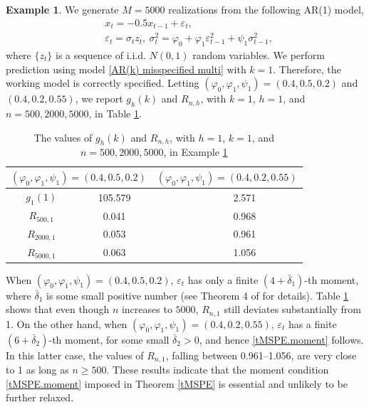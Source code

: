 \documentclass[ejsv2]{imsart}
\theoremstyle{plain}
\theoremstyle{definition}
\newtheorem{example}{Example}[section]
\theoremstyle{remark}
\begin{document}
\begin{example}\label{ex.S2.1}
We generate $M=5000$ realizations from the following
AR(1) model,
\begin{equation*}
\begin{split}
     & x_t=-0.5x_{t-1}+\varepsilon_t, \\
     & \varepsilon_t=\sigma_tz_t,\ \sigma_t^2=\varphi_0+\varphi_1\varepsilon_{t-1}^2+\psi_1\sigma_{t-1}^2,
\end{split}
\end{equation*}
where $\{z_t\}$ is a sequence of
i.i.d. $N(0,1)$ random variables.
We perform prediction using
model \eqref{AR(k) misspecified multi} with $k=1$. Therefore, the working model is correctly specified.
Letting $(\varphi_0,\varphi_1,\psi_1)=(0.4,0.5,0.2)$ and $(0.4,0.2,0.55)$,
we report $g_{h}(k)$ and $R_{n,h}$, with $k=1$, $h=1$,
and $n=500, 2000, 5000$, in Table \ref{tabS1}.
\end{example}

\begin{table}
\caption{The values of $g_{h}(k)$ and $R_{n,h}$, with $h=1$, $k=1$, and $n=500, 2000, 5000$, in Example \ref{ex.S2.1}}
\label{tabS1}
\centering
\begin{tabular}{cccc} \hline
    \multicolumn{2}{c}{$(\varphi_0,\varphi_1,\psi_1)=(0.4,0.5,0.2)$} &  \multicolumn{2}{c}{$(\varphi_0,\varphi_1,\psi_1)=(0.4,0.2,0.55)$}\\ \hline
   $g_{1}(1)$ & 105.579 &  & 2.571\\ \hline
   $R_{500,1}$ & 0.041 & & 0.968 \\
   $R_{2000,1}$ & 0.053 &  & 0.961 \\
   $R_{5000,1}$ & 0.063 &   & 1.056 \\ \hline
  \end{tabular}
\end{table}

When $(\varphi_0,\varphi_1,\psi_1)=(0.4,0.5,0.2)$, $\varepsilon_t$
has only a finite $(4+\bar{\delta}_1)$-th moment, where $\bar{\delta}_1$ is some small positive number
(see Theorem 4 of \cite{N1990} for details). Table \ref{tabS1} shows that even
though $n$ increases to $5000$, $R_{n,1}$
still
deviates substantially from 1.
On the other hand, when $(\varphi_0,\varphi_1,\psi_1)=(0.4,0.2,0.55)$,
$\varepsilon_t$ has a
finite $(6+\bar{\delta}_2)$-th moment, for some small $\bar{\delta}_2>0$,
and hence \eqref{tMSPE.moment} follows.
In this latter case, the values of $R_{n,1}$, falling between 0.961--1.056,
are very close to 1 as long as $n\geq 500$.
These results indicate that the moment condition
\eqref{tMSPE.moment}
imposed in Theorem \ref{tMSPE} is essential and unlikely to be further relaxed.
\end{document}
